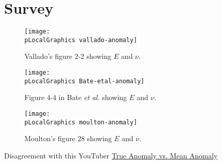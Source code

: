 % 

\section{Survey}
\label{sec:geo}
		 
\begin{figure}[htbp] %
\centering
\begin{center}
   \texttt{[image: \\pLocalGraphics vallado-anomaly]} 
   \caption{Vallado's figure 2-2 showing $E$ and $\nu$.}
\end{center}
   \label{fig:anomaly-vallado}
\end{figure}

\begin{figure}[htbp] %
\begin{center}
   \texttt{[image: \\pLocalGraphics Bate-etal-anomaly]} 
   \caption{Figure 4-4 in Bate \emph{et al.}  showing $E$ and $\nu$.}
\end{center}
   \label{fig:anomaly-bate}
\end{figure}

\begin{figure}[htbp] %
   \centering
   \texttt{[image: \\pLocalGraphics moulton-anomaly]} 
   \caption{Moulton's figure 28 showing $E$ and $\nu$.}
   \label{fig:anomaly-mouton}
\end{figure}

Disagreement with this YouTuber \href{https://www.youtube.com/watch?v=cf9Jh44kL20}{True Anomaly vs. Mean Anomaly}

\endinput  %
